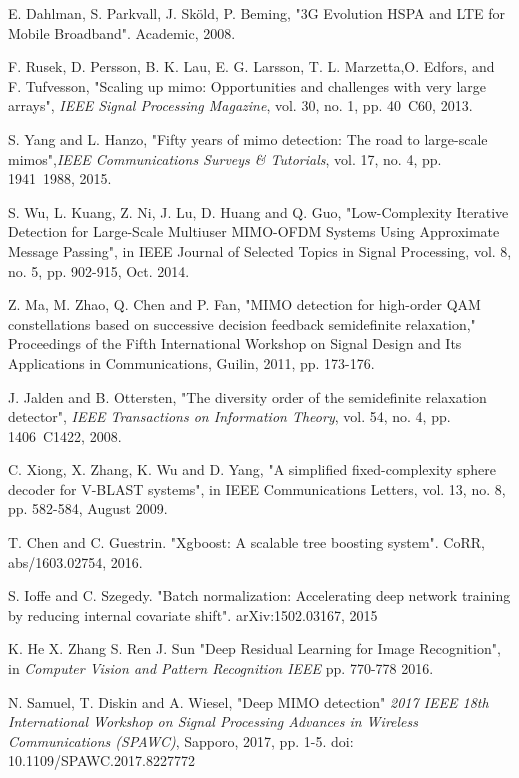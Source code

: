 \documentclass[conference]{IEEEtran}
\begin{document}
\begin{thebibliography}{1}

E. Dahlman, S. Parkvall, J. Sköld, P. Beming, "3G Evolution HSPA and LTE for Mobile Broadband". Academic, 2008.

F. Rusek, D. Persson, B. K. Lau, E. G. Larsson, T. L. Marzetta,O. Edfors, and F. Tufvesson, "Scaling up mimo: Opportunities and challenges with very large arrays", \emph{IEEE Signal Processing Magazine}, vol. 30, no. 1, pp. 40~C60, 2013.

S. Yang and L. Hanzo, "Fifty years of mimo detection: The road to large-scale mimos",\emph{IEEE Communications Surveys \& Tutorials}, vol. 17, no. 4, pp. 1941~1988, 2015.

S. Wu, L. Kuang, Z. Ni, J. Lu, D. Huang and Q. Guo, "Low-Complexity Iterative Detection for Large-Scale Multiuser MIMO-OFDM Systems Using Approximate Message Passing", in IEEE Journal of Selected Topics in Signal Processing, vol. 8, no. 5, pp. 902-915, Oct. 2014.

Z. Ma, M. Zhao, Q. Chen and P. Fan, "MIMO detection for high-order QAM constellations based on successive decision feedback semidefinite relaxation," Proceedings of the Fifth International Workshop on Signal Design and Its Applications in Communications, Guilin, 2011, pp. 173-176.

J. Jalden and B. Ottersten, "The diversity order of the semidefinite relaxation detector", \emph{IEEE Transactions on Information Theory}, vol. 54, no. 4, pp. 1406~C1422, 2008.

C. Xiong, X. Zhang, K. Wu and D. Yang, "A simplified fixed-complexity sphere decoder for V-BLAST systems", in IEEE Communications Letters, vol. 13, no. 8, pp. 582-584, August 2009.

T. Chen and C. Guestrin. "Xgboost: A scalable tree boosting system". CoRR, abs/1603.02754, 2016.

S. Ioffe and C. Szegedy. "Batch normalization: Accelerating deep network training by reducing internal covariate shift". arXiv:1502.03167, 2015


K. He X. Zhang S. Ren J. Sun "Deep Residual Learning for Image Recognition", in \emph{Computer Vision and Pattern Recognition IEEE} pp. 770-778 2016.


N. Samuel, T. Diskin and A. Wiesel, "Deep MIMO detection" \emph{2017 IEEE 18th International Workshop on Signal Processing Advances in Wireless Communications (SPAWC)}, Sapporo, 2017, pp. 1-5. doi: 10.1109/SPAWC.2017.8227772






\end{thebibliography}




\end{document}

